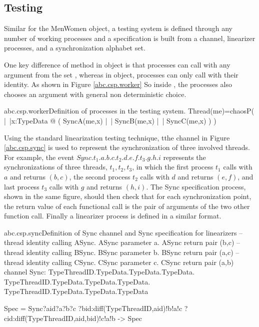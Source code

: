 \documentclass{article}
\begin{document}
\subsection{Testing}
Similar for the MenWomen object, a testing system is defined through any number of working processes and a specification is built from a  channel, linearizer processes, and a synchronization alphabet set. 

One key difference of method in  object is that processes can call with any argument from the set , whereas in  object, processes can only call with their identity. As shown in Figure \ref{abc.csp.worker} So inside , the processes also chooses an argument with general non deterministic choice. 

\begin{cspinline}{abc.csp.worker}{Definition of processes in the testing system.}
Thread(me)=chaosP(
  |~|x:TypeData @ (
        SyncA(me,x) 
    |~| SyncB(me,x) 
    |~| SyncC(me,x)
  )
)
\end{cspinline}

Using the standard linearization testing technique, tthe  channel in Figure \ref{abc.csp.sync} is used to represent the synchronization of three involved threads. For example, the event $Sync.t_1.a.b.c.t_2.d.e.f.t_3.g.h.i$ represents the synchronizations of three threads, $t_1,t_2,t_3$, in which the first process $t_1$ calls  with $a$ and returns $(b,c)$, the second process $t_2$ calls  with $d$ and returns $(e,f)$, and last process $t_3$ calls  with $g$ and returns $(h,i)$. The Sync specification process, shown in the same figure, should then check that for each synchronization point, the return value of each functional call is the pair of arguments of the two other function call. Finally a linearizer process is defined in a similar format. 

\begin{cspinline}{abc.csp.sync}{Definition of Sync channel and Sync specification for linearizers}
--thread identity calling ASync. ASync parameter a. ASync return pair (b,c)
--thread identity calling BSync. BSync parameter b. BSync return pair (a,c)
--thread identity calling CSync. CSync parameter c. CSync return pair (a,b)
channel Sync: TypeThreadID.TypeData.TypeData.TypeData.
              TypeThreadID.TypeData.TypeData.TypeData.
              TypeThreadID.TypeData.TypeData.TypeData

Spec = Sync?aid?a?b?c
           ?bid:diff(TypeThreadID,{aid})!b!a!c
           ?cid:diff(TypeThreadID,{aid,bid})!c!a!b 
    -> Spec
\end{cspinline}
\end{document}
